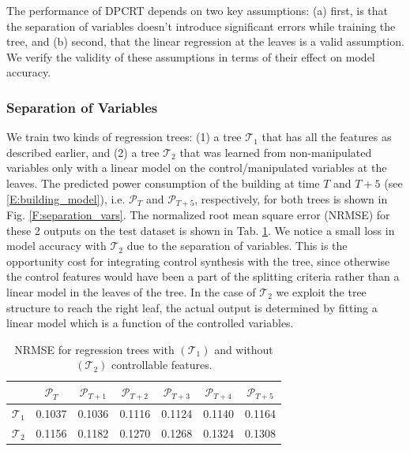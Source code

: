 The performance of DPCRT depends on two key assumptions: (a) first, is that the separation of variables doesn't introduce significant errors while training the tree, and (b) second, that the linear regression at the leaves is a valid assumption.
We verify the validity of these assumptions in terms of their effect on model accuracy.

\subsubsection{Separation of Variables}
We train two kinds of regression trees: (1) a tree $\mathcal{T}_1$ that has all the features as described earlier, and (2) a tree $\mathcal{T}_2$ that was learned from non-manipulated variables only with a linear model on the control/manipulated variables at the leaves.
The predicted power consumption of the building at time $T$ and $T+5$ (see \eqref{E:building_model}), i.e. $\mathcal{P}_T$ and $\mathcal{P}_{T+5}$, respectively, for both trees is shown in Fig. \ref{F:separation_vars}. The normalized root mean square error (NRMSE) for these 2 outputs on the test dataset is shown in Tab. \ref{T:NMRSE_separation_vars}. We notice a small loss in model accuracy with $\mathcal{T}_2$ due to the separation of variables. 
This is the opportunity cost for integrating control synthesis with the tree, since otherwise the control features would have been a part of the splitting criteria rather than a linear model in the leaves of the tree.
In the case of $\mathcal{T}_2$ we exploit the tree structure to reach the right leaf, the actual output is determined by fitting a linear model which is a function of the controlled variables.

\begin{table}
  \centering
  \caption{NRMSE for regression trees with $(\mathcal{T}_1)$ and without $(\mathcal{T}_2)$ controllable features.}
    \begin{tabular}{c|c|c|c|c|c|c}
    \toprule
     & $\mathcal{P}_{T}$ &$\mathcal{P}_{T+1}$ &$\mathcal{P}_{T+2}$ &$\mathcal{P}_{T+3}$ &$\mathcal{P}_{T+4}$ & $\mathcal{P}_{T+5}$ \\
    \midrule
    $\mathcal{T}_1$     & 0.1037  &  0.1036 &   0.1116 &   0.1124 &   0.1140  &  0.1164  \\
    $\mathcal{T}_2$     & 0.1156  &  0.1182 &   0.1270 &   0.1268 &   0.1324  &  0.1308  \\
    \bottomrule
    \end{tabular}
  \label{T:NMRSE_separation_vars}
\end{table}

